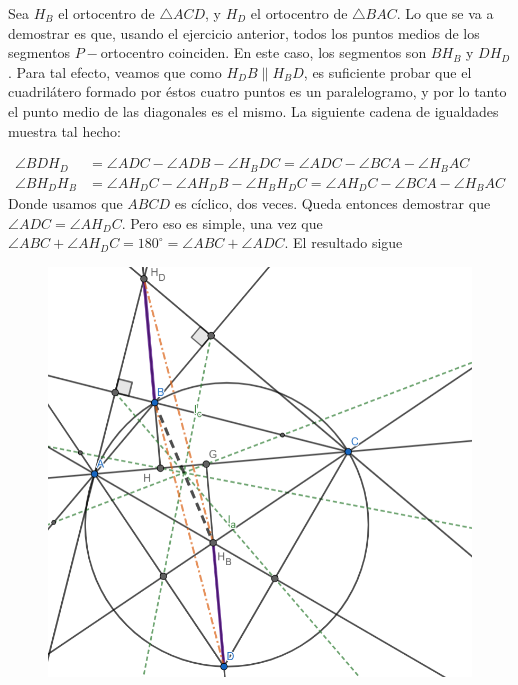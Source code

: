 \begin{sol}
	
	Sea $H_{B}$ el ortocentro de $\triangle ACD$, y $H_{D}$ el ortocentro de $\triangle BAC$. Lo que se va a demostrar es que, usando el ejercicio anterior, todos los puntos medios de los segmentos $P-$ortocentro coinciden. En este caso, los segmentos son $BH_{B}$ y $DH_{D}$. Para tal efecto, veamos que como $H_{D}B \parallel H_{B}D$, es suficiente probar que el cuadril\'atero formado por \'estos cuatro puntos es un paralelogramo, y por lo tanto el punto medio de las diagonales es el mismo. La siguiente cadena de igualdades muestra tal hecho: 
	
	\begin{align}
	\angle BDH_{D} &= \angle ADC - \angle ADB - \angle H_{B}DC = \angle ADC - \angle BCA - \angle H_{B}AC \\
	\angle BH_{D}H_{B} &= \angle AH_{D}C - \angle AH_{D}B - \angle H_{B}H_{D}C = \angle AH_{D}C -\angle BCA - \angle H_{B}AC
	\end{align}
	 Donde usamos que $ABCD$ es c\'iclico, dos veces. Queda entonces demostrar que $\angle ADC = \angle AH_{D}C$. Pero eso es simple, una vez que $\angle ABC + \angle AH_{D}C = 180^{\circ} = \angle ABC + \angle ADC$. El resultado sigue
	 
	 \begin{figure}[h!]
	 	\centering
	 	\includegraphics[scale=0.5]{Imgs/JT7.png}
	 \end{figure}
	 
\end{sol}

